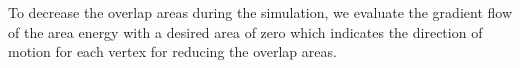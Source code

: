 To decrease the overlap areas during the simulation, we evaluate the gradient flow of the area energy with a desired area of zero which indicates the direction of motion for each vertex for reducing the overlap areas.

\newcommand{\vargs}{\ensuremath{\vec{v}_{\text{out}}^{\: i}, \vec{v}_{\text{in}}^{\: i}, \vec{v}_{\text{out}}^{\: m}, \vec{v}_{\text{in}}^{\: m}}}
\newcommand{\tu}{\ensuremath{(\vec{v}_{\text{out}}^{\: m} - \vec{v}_{\text{out}}^{\: i}) \times (\vec{v}_{\text{in}}^{\: m} - \vec{v}_{\text{out}}^{\: m})}}
\newcommand{\tl}{\ensuremath{(\vec{v}_{\text{in}}^{\: i} - \vec{v}_{\text{out}}^{\: i}) \times (\vec{v}_{\text{in}}^{\: m} - \vec{v}_{\text{out}}^{\: m})}}
\newcommand{\tz}{\ensuremath{\dfrac{\tu}{\tl}}}
\newcommand{\w}{\ensuremath{\vec{v}_{\text{out}}^{\: i} + \tz (\vec{v}_{\text{in}}^{\: i} - \vec{v}_{\text{out}}^{\: i})}}

